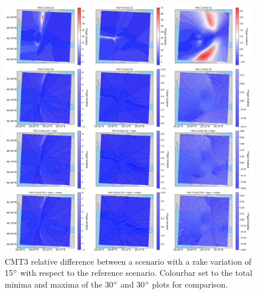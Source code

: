 \documentclass[../Text/00main.tex]{subfiles}
\begin{document}
\begin{figure}[!h]
    \centering
    \includegraphics[width=1\linewidth,trim = 2cm 5cm 1cm 5cm, clip]{images_results/rake_variation_epsilon12_sc3.png}
    \caption{CMT3 relative difference between a scenario with a rake variation of 15$\degree$ with respect to the reference scenario. Colourbar set to the total minima and maxima of the 30$\degree$ and 30$\degree$ plots for comparison.}
    \label{fig:ref_eps12-2}
\end{figure}
\end{document}
